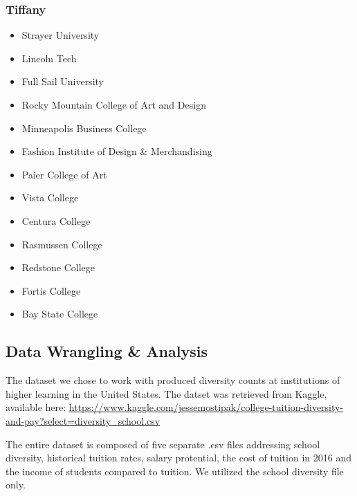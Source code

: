 \documentclass[
]{article}
\providecommand{\tightlist}{%
  \setlength{\itemsep}{0pt}\setlength{\parskip}{0pt}}
\begin{document}
\hypertarget{tiffany}{%
\subsubsection{Tiffany}\label{tiffany}}

\begin{itemize}
\tightlist
\item
  Strayer University\\
\item
  Lincoln Tech\\
\item
  Full Sail University\\
\item
  Rocky Mountain College of Art and Design\\
\item
  Minneapolis Business College\\
\item
  Fashion Institute of Design \& Merchandising\\
\item
  Paier College of Art
\item
  Vista College
\item
  Centura College\\
\item
  Rasmussen College
\item
  Redstone College\\
\item
  Fortis College\\
\item
  Bay State College
\end{itemize}

\hypertarget{data-wrangling-analysis}{%
\subsection{\texorpdfstring{\textbf{Data Wrangling \&
Analysis}}{Data Wrangling \& Analysis}}\label{data-wrangling-analysis}}

The dataset we chose to work with produced diversity counts at
institutions of higher learning in the United States. The datset was
retrieved from Kaggle, available here:
\url{https://www.kaggle.com/jessemostipak/college-tuition-diversity-and-pay?select=diversity_school.csv}

The entire dataset is composed of five separate .csv files addressing
school diversity, historical tuition rates, salary protential, the cost
of tuition in 2016 and the income of students compared to tuition. We
utilized the school diversity file only.
\end{document}
